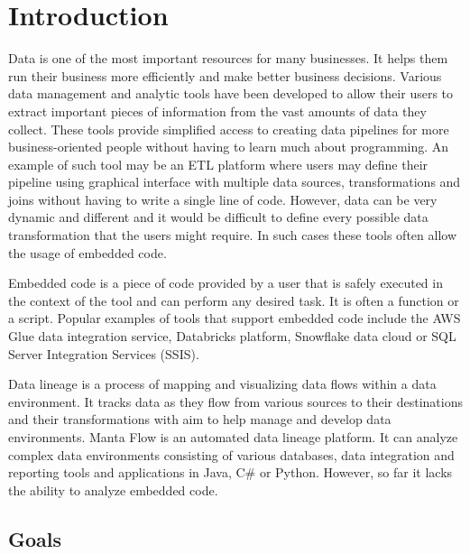 \chapter{Introduction}

Data is one of the most important resources for many businesses. It helps them run their business more efficiently and make better business decisions. Various data management and analytic tools have been developed to allow their users to extract important pieces of information from the vast amounts of data they collect. These tools provide simplified access to creating data pipelines for more business-oriented people without having to learn much about programming. An example of such tool may be an ETL platform where users may define their pipeline using graphical interface with multiple data sources, transformations and joins without having to write a single line of code. However, data can be very dynamic and different and it would be difficult to define every possible data transformation that the users might require. In such cases these tools often allow the usage of embedded code.
\par
Embedded code is a piece of code provided by a user that is safely executed in the context of the tool and can perform any desired task. It is often a function or a script. Popular examples of tools that support embedded code include the AWS Glue data integration service, Databricks platform, Snowflake data cloud or SQL Server Integration Services (SSIS).
\par
Data lineage is a process of mapping and visualizing data flows within a data environment. It tracks data as they flow from various sources to their destinations and their transformations with aim to help manage and develop data environments. Manta Flow is an automated data lineage platform. It can analyze complex data environments consisting of various databases, data integration and reporting tools and applications in Java, C\# or Python. However, so far it lacks the ability to analyze embedded code.

\section{Goals}

